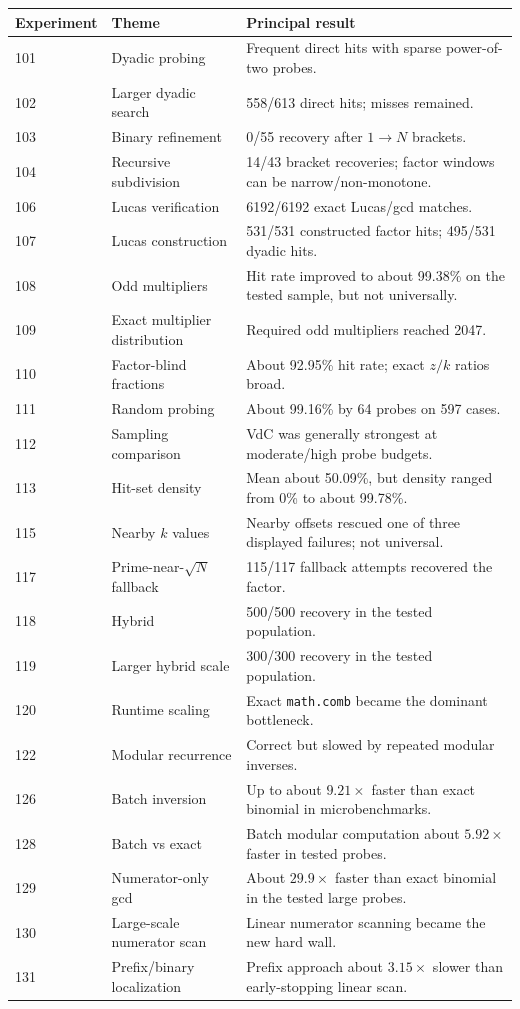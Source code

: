 \documentclass[11pt,a4paper]{article}
\begin{document}
\begin{longtable}{p{}p{}p{}}
\toprule
Experiment & Theme & Principal result \\
\midrule
101 & Dyadic probing & Frequent direct hits with sparse power-of-two probes. \\
102 & Larger dyadic search & 558/613 direct hits; misses remained. \\
103 & Binary refinement & 0/55 recovery after $1\to N$ brackets. \\
104 & Recursive subdivision & 14/43 bracket recoveries; factor windows can be narrow/non-monotone. \\
106 & Lucas verification & 6192/6192 exact Lucas/gcd matches. \\
107 & Lucas construction & 531/531 constructed factor hits; 495/531 dyadic hits. \\
108 & Odd multipliers & Hit rate improved to about 99.38\% on the tested sample, but not universally. \\
109 & Exact multiplier distribution & Required odd multipliers reached 2047. \\
110 & Factor-blind fractions & About 92.95\% hit rate; exact $z/k$ ratios broad. \\
111 & Random probing & About 99.16\% by 64 probes on 597 cases. \\
112 & Sampling comparison & VdC was generally strongest at moderate/high probe budgets. \\
113 & Hit-set density & Mean about 50.09\%, but density ranged from 0\% to about 99.78\%. \\
115 & Nearby $k$ values & Nearby offsets rescued one of three displayed failures; not universal. \\
117 & Prime-near-$\sqrt N$ fallback & 115/117 fallback attempts recovered the factor. \\
118 & Hybrid & 500/500 recovery in the tested population. \\
119 & Larger hybrid scale & 300/300 recovery in the tested population. \\
120 & Runtime scaling & Exact \texttt{math.comb} became the dominant bottleneck. \\
122 & Modular recurrence & Correct but slowed by repeated modular inverses. \\
126 & Batch inversion & Up to about $9.21\times$ faster than exact binomial in microbenchmarks. \\
128 & Batch vs exact & Batch modular computation about $5.92\times$ faster in tested probes. \\
129 & Numerator-only gcd & About $29.9\times$ faster than exact binomial in the tested large probes. \\
130 & Large-scale numerator scan & Linear numerator scanning became the new hard wall. \\
131 & Prefix/binary localization & Prefix approach about $3.15\times$ slower than early-stopping linear scan. \\
\bottomrule
\end{longtable}
\end{document}

